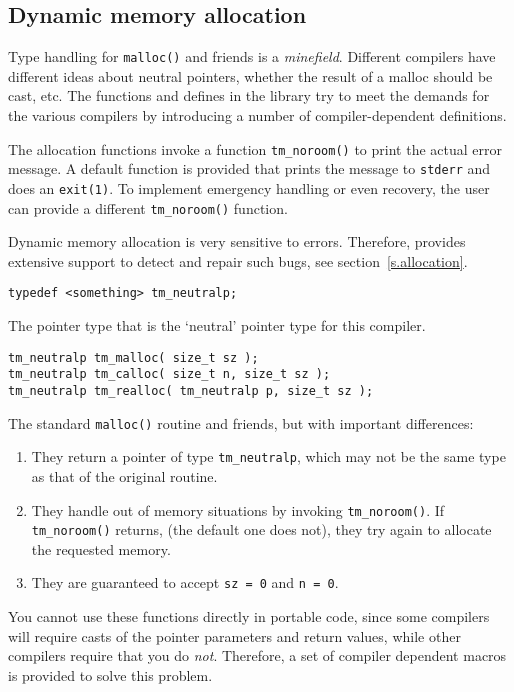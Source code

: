 \subsection{Dynamic memory allocation}
\label{s.malloc}
Type handling for \verb+malloc()+ and friends is a {\em minefield}.
Different compilers have different ideas about neutral pointers, whether the
result of a malloc should be cast, etc.
The functions and defines in the {\Tm} {\C} library try to meet the demands
for the various compilers by introducing a number of 
compiler-dependent definitions.
\par
The allocation functions invoke a function \verb+tm_noroom()+ to print
the actual error message.
A default function is provided that prints the message to \verb+stderr+
and does an \verb+exit(1)+.
To implement emergency handling or even recovery,
the user can provide a different \verb+tm_noroom()+ function.
\par
Dynamic memory allocation is very sensitive to errors.
Therefore,
{\Tm} provides extensive support to detect and repair such bugs,
see section~\ref{s.allocation}.
\begin{verbatim}
typedef <something> tm_neutralp;
\end{verbatim}
\begin{desc}
The pointer type that is the `neutral' pointer type for this compiler.
\end{desc}
\begin{verbatim}
tm_neutralp tm_malloc( size_t sz );
tm_neutralp tm_calloc( size_t n, size_t sz );
tm_neutralp tm_realloc( tm_neutralp p, size_t sz );
\end{verbatim}
\begin{desc}
The standard \verb+malloc()+ routine and friends,
but with important differences:
\begin{enumerate}
\item They return a pointer of type \verb+tm_neutralp+, which may not
      be the same type as that of the original routine.
\item They handle out of memory situations by invoking \verb+tm_noroom()+.
      If \verb'tm_noroom()' returns, (the default one does not),
      they try again to allocate the requested memory.
\item They are guaranteed to accept \verb'sz = 0' and \verb'n = 0'.
\end{enumerate}
You cannot use these functions directly in portable code,
since some compilers will require casts of the pointer parameters and
return values,
while other compilers require that you do {\em not}.
Therefore,
a set of compiler dependent macros is provided to solve this problem.
\end{desc}
